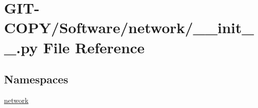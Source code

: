 \hypertarget{GIT-COPY_2Software_2network_2____init_____8py}{}\section{G\+I\+T-\/\+C\+O\+P\+Y/\+Software/network/\+\_\+\+\_\+init\+\_\+\+\_\+.py File Reference}
\label{GIT-COPY_2Software_2network_2____init_____8py}
\subsection*{Namespaces}
\begin{DoxyCompactItemize}
\item 
 \hyperlink{namespacenetwork}{network}
\end{DoxyCompactItemize}
